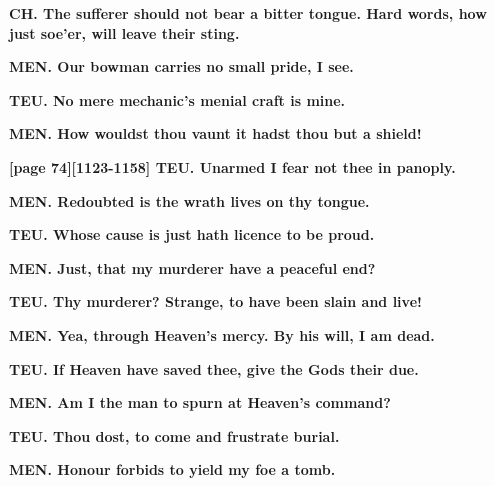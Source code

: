 \documentclass[11pt,letter]{book}
\begin{document}
\par \textbf{CH. The sufferer should not bear a bitter tongue. Hard words, how just soe’er, will leave their sting.}
\par 

\par \textbf{MEN. Our bowman carries no small pride, I see.}
\par 

\par \textbf{TEU. No mere mechanic’s menial craft is mine.}
\par 

\par \textbf{MEN. How wouldst thou vaunt it hadst thou but a shield!}
\par 

\par \textbf{[page 74][1123-1158] TEU. Unarmed I fear not thee in panoply.}
\par 

\par \textbf{MEN. Redoubted is the wrath lives on thy tongue.}
\par 

\par \textbf{TEU. Whose cause is just hath licence to be proud.}
\par 

\par \textbf{MEN. Just, that my murderer have a peaceful end?}
\par 

\par \textbf{TEU. Thy murderer? Strange, to have been slain and live!}
\par 

\par \textbf{MEN. Yea, through Heaven’s mercy. By his will, I am dead.}
\par 

\par \textbf{TEU. If Heaven have saved thee, give the Gods their due.}
\par 

\par \textbf{MEN. Am I the man to spurn at Heaven’s command?}
\par 

\par \textbf{TEU. Thou dost, to come and frustrate burial.}
\par 

\par \textbf{MEN. Honour forbids to yield my foe a tomb.}
\par 
\end{document}
